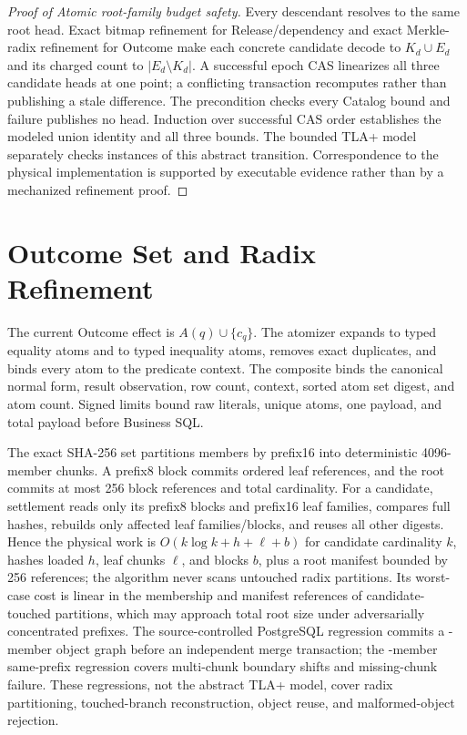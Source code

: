 \documentclass[journal,onecolumn]{IEEEtran}
\newcommand{\code}[1]{\texttt{\detokenize{#1}}}
\begin{document}
\begin{proof}[Proof of Atomic root-family budget safety]
Every descendant resolves to the same root head. Exact bitmap refinement for
Release/dependency and exact Merkle-radix refinement for Outcome make each
concrete candidate decode to $K_d\cup E_d$ and its charged count to
$|E_d\setminus K_d|$. A successful epoch CAS linearizes all three candidate
heads at one point; a conflicting transaction recomputes rather than publishing
a stale difference. The precondition checks every Catalog bound and failure
publishes no head. Induction over successful CAS order establishes the modeled
union identity and all three bounds. The bounded TLA+ model separately checks
instances of this abstract transition. Correspondence to the physical
implementation is supported by executable evidence rather than by a mechanized
refinement proof.
\end{proof}

\section{Outcome Set and Radix Refinement}

The current Outcome effect is $A(q)\cup\{c_q\}$. The atomizer expands \code{IN} to
typed equality atoms and \code{NOT IN} to typed inequality atoms, removes exact
duplicates, and binds every atom to the predicate context. The composite binds
the canonical normal form, result observation, row count, context, sorted atom
set digest, and atom count. Signed limits bound raw literals, unique atoms, one
payload, and total payload before Business SQL.

The exact SHA-256 set partitions members by prefix16 into deterministic
4096-member chunks. A prefix8 block commits ordered leaf references, and the
root commits at most 256 block references and total cardinality. For a
candidate, settlement reads only its prefix8 blocks and prefix16 leaf families,
compares full hashes, rebuilds only affected leaf families/blocks, and reuses
all other digests. Hence the physical work is
$O(k\log k+h+\ell+b)$ for candidate cardinality $k$, hashes loaded $h$, leaf
chunks $\ell$, and blocks $b$, plus a root manifest bounded by 256 references;
the algorithm never scans untouched radix partitions. Its worst-case cost is
linear in the membership and manifest references of candidate-touched
partitions, which may approach total root size under adversarially concentrated
prefixes. The source-controlled PostgreSQL regression commits a
\VFiveRootCardinality{}-member object graph before an independent merge
transaction; the \VFiveSamePrefixMembers{}-member same-prefix regression covers
multi-chunk boundary shifts and missing-chunk failure. These regressions, not
the abstract TLA+ model, cover radix partitioning, touched-branch reconstruction,
object reuse, and malformed-object rejection.
\end{document}
